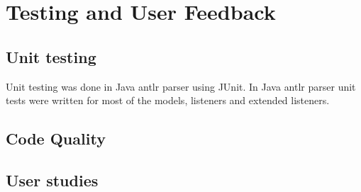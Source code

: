 \chapter{Testing and User Feedback}
\label{chap:testing}

\section{Unit testing}
Unit testing was done in Java \gls{antlr} parser using JUnit. In Java \gls{antlr} parser unit tests were written for most of the models, listeners and extended listeners. 

\section{Code Quality}

\section{User studies}

